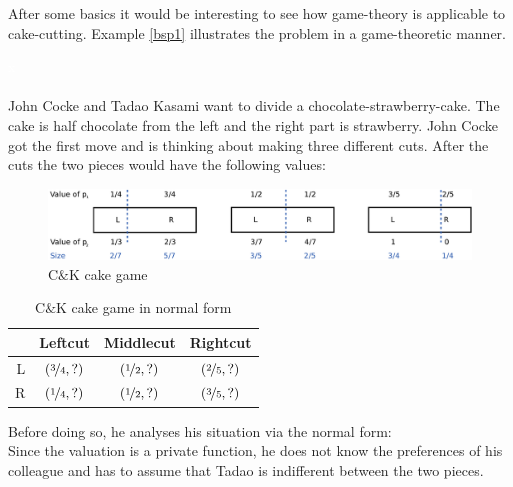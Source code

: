 \newline
After some basics it would be interesting to see how game-theory is applicable to cake-cutting. Example \ref{bsp1} illustrates the problem in a game-theoretic manner.
\begin{bsp}
\label{bsp1}
\textcolor{white}{x}\\\\
John Cocke and Tadao Kasami want to divide a chocolate-strawberry-cake. The cake is half chocolate from the left and the right part is strawberry. John Cocke got the first move and is thinking about making three different cuts. After the cuts the two pieces would have the following values:
	\begin{figure}[!h]
		\centering
 		 \includegraphics[width=390pt]{bilder/ex1.pdf}
   \caption{C$\&$K cake game}
  	 \end{figure}
  	 \newline
\begin{table}[htb]
\centering
 \renewcommand{\arraystretch}{1.2} 
\begin{tabular}{c|c|c|c|}
\cline{2-4}
&\multicolumn{1}{|c|}{{Leftcut}}& {Middlecut}&{Rightcut}\\
\hline
\multicolumn{1}{|r|}{{L}}&$\left(\nicefrac{3}{4}, ?\right)$&$\left(\nicefrac{1}{2}, ?\right)$&$\left(\nicefrac{2}{5}, ?\right)$\\
\hline
\multicolumn{1}{|r|}{{R}}&$\left(\nicefrac{1}{4}, ?\right)$&$\left(\nicefrac{1}{2}, ?\right)$&$\left(\nicefrac{3}{5}, ?\right)$\\
\hline
\end{tabular}
\caption{C$\&$K cake game in normal form}\label{Table1}
\end{table}
Before doing so, he analyses his situation via the normal form:\\Since the valuation is a private function, he does not know the preferences of his colleague and has to assume that Tadao is indifferent between the two pieces. %

\end{bsp}
